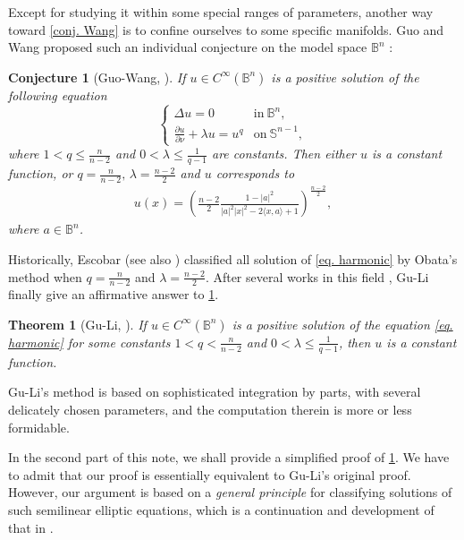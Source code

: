 \documentclass[12pt]{amsart}
\newtheorem{theorem}{Theorem}
\newtheorem{conjecture}{Conjecture}
\numberwithin{equation}{section}
\numberwithin{lemma}{section}
\numberwithin{proposition}{section}
\numberwithin{corollary}{section}
\numberwithin{remark}{section}
\begin{document}
	Except for studying it within some special ranges of parameters,  another way toward \cref{conj. Wang} is to confine ourselves to some specific manifolds. Guo and Wang  proposed such an individual conjecture on the model space $\mathbb{B}^n$  \cite[Conjecture 1]{GW20}:
    \begin{conjecture}[Guo-Wang, \cite{GW20}]\label{conj.Guo-Wang}
        If $u\in C^{\infty}(\mathbb{B}^n)$ is a positive solution of the following equation
        \begin{equation}\label{eq. harmonic}
            \begin{cases}
                \Delta u=0 &\mathrm{ in} \ \mathbb{B}^n,\\
                \frac{\partial u}{\partial\nu}+\lambda u=u^q &\mathrm{on}\ \mathbb{S}^{n-1},
            \end{cases}
        \end{equation}
        where $1<q\leq\frac{n}{n-2}$ and $0<\lambda \leq \frac{1}{q-1}$ are constants. Then either $u$ is a constant function, or $q=\frac{n}{n-2},\, \lambda=\frac{n-2}{2}$ and $u$ corresponds to
    \begin{align}\label{eq. model solution}
            u(x)=\left(
            \frac{n-2}{2}\frac{1-|a|^2}{|a|^2|x|^2-2\langle x,a\rangle+1}
            \right)^{\frac{n-2}{2}},
        \end{align}
        where $a\in \mathbb{B}^n$.
    \end{conjecture}

    Historically, Escobar \cite[Theorem 2.1]{Esc90} (see also \cite{Esc88}) classified all solution of \cref{eq. harmonic} by Obata's method \cite{Oba71} when $q=\frac{n}{n-2}$ and $\lambda=\frac{n-2}{2}$. After several works in this field \cite{GW20,GHW21,LO23,Ou24}, Gu-Li \cite[Theorem 1.1]{GL25} finally give an affirmative answer to \cref{conj.Guo-Wang}.

    \begin{theorem}[Gu-Li, \cite{GL25}]\label{thm. GL25}
        If $u\in C^{\infty}(\mathbb{B}^n)$ is a positive solution of the  equation
        \cref{eq. harmonic}
        for some constants $1<q<\frac{n}{n-2}$ and $0<\lambda \leq \frac{1}{q-1}$, then $u$ is a constant function.
    \end{theorem}

    Gu-Li's method is based on sophisticated integration by parts, with several delicately chosen parameters, and the computation therein is more or less formidable.

    In the second part of this note, we shall provide a simplified proof of \cref{thm. GL25}. We have to admit that our proof is essentially equivalent to Gu-Li's original proof. However, our argument is based on a \emph{general principle} for classifying solutions of such semilinear elliptic equations, which is a continuation and development of that in \cite{Wan22}. 
    
\end{document}
